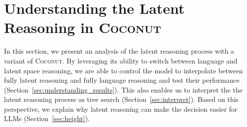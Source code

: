 \documentclass[]{fairmeta}
\newcommand{\ours}{\textsc{Coconut}\xspace}
\begin{document}



\section{Understanding the Latent Reasoning in \ours}
\label{sec:understanding}
In this section, we present an analysis of the latent reasoning process with a variant of \ours. 
By leveraging its ability to switch between language and latent space reasoning, we are able to control the model to interpolate between fully latent reasoning and fully language reasoning and test their performance (Section~\ref{sec:understanding_results}). This also enables us to interpret the the latent reasoning process as tree search (Section~\ref{sec:interpret}). Based on this perspective, we explain why latent reasoning can make the decision easier for LLMs (Section~\ref{sec:height}).



\end{document}
